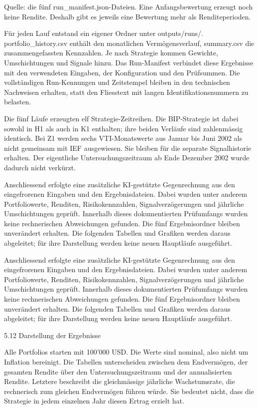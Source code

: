 \documentclass[
  ngerman,
  a4paper,
  DIV=11,
  oneside]{scrreprt}
\begin{document}
Quelle: die fünf run\_manifest.json-Dateien. Eine Anfangsbewertung
erzeugt noch keine Rendite. Deshalb gibt es jeweils eine Bewertung mehr
als Renditeperioden.

Für jeden Lauf entstand ein eigener Ordner unter outputs/runs/.
portfolio\_history.csv enthält den monatlichen Vermögensverlauf,
summary.csv die zusammengefassten Kennzahlen. Je nach Strategie kommen
Gewichte, Umschichtungen und Signale hinzu. Das Run-Manifest verbindet
diese Ergebnisse mit den verwendeten Eingaben, der Konfiguration und den
Prüfsummen. Die vollständigen Run-Kennungen und Zeitstempel bleiben in
den technischen Nachweisen erhalten, statt den Fliesstext mit langen
Identifikationsnummern zu belasten.

Die fünf Läufe erzeugten elf Strategie-Zeitreihen. Die BIP-Strategie ist
dabei sowohl in H1 als auch in K1 enthalten; ihre beiden Verläufe sind
zahlenmässig identisch. Bei Z1 werden sechs VTI-Monatswerte aus Januar
bis Juni 2002 als nicht gemeinsam mit IEF ausgewiesen. Sie bleiben für
die separate Signalhistorie erhalten. Der eigentliche
Untersuchungszeitraum ab Ende Dezember 2002 wurde dadurch nicht
verkürzt.

Anschliessend erfolgte eine zusätzliche KI-gestützte Gegenrechnung aus
den eingefrorenen Eingaben und den Ergebnisdateien. Dabei wurden unter
anderem Portfoliowerte, Renditen, Risikokennzahlen, Signalverzögerungen
und jährliche Umschichtungen geprüft. Innerhalb dieses dokumentierten
Prüfumfangs wurden keine rechnerischen Abweichungen gefunden. Die fünf
Ergebnisordner bleiben unverändert erhalten. Die folgenden Tabellen und
Grafiken werden daraus abgeleitet; für ihre Darstellung werden keine
neuen Hauptläufe ausgeführt.

Anschliessend erfolgte eine zusätzliche KI-gestützte Gegenrechnung aus
den eingefrorenen Eingaben und den Ergebnisdateien. Dabei wurden unter
anderem Portfoliowerte, Renditen, Risikokennzahlen, Signalverzögerungen
und jährliche Umschichtungen geprüft. Innerhalb dieses dokumentierten
Prüfumfangs wurden keine rechnerischen Abweichungen gefunden. Die fünf
Ergebnisordner bleiben unverändert erhalten. Die folgenden Tabellen und
Grafiken werden daraus abgeleitet; für ihre Darstellung werden keine
neuen Hauptläufe ausgeführt.

5.12 Darstellung der Ergebnisse

Alle Portfolios starten mit 100'000 USD. Die Werte sind nominal, also
nicht um Inflation bereinigt. Die Tabellen unterscheiden zwischen dem
Endvermögen, der gesamten Rendite über den Untersuchungszeitraum und der
annualisierten Rendite. Letztere beschreibt die gleichmässige jährliche
Wachstumsrate, die rechnerisch zum gleichen Endvermögen führen würde.
Sie bedeutet nicht, dass die Strategie in jedem einzelnen Jahr diesen
Ertrag erzielt hat.
\end{document}
